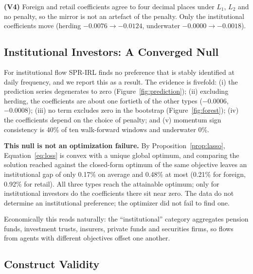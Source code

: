 \textbf{(V4)} Foreign and retail coefficients agree to four decimal places under
$L_1$, $L_2$ and no penalty, so the mirror is not an artefact of the penalty.
Only the institutional coefficients move (herding
$-0.0076\rightarrow-0.0124$, underwater $-0.0000\rightarrow-0.0018$).

\subsection{Institutional Investors: A Converged Null}
\label{sec:null}

For institutional flow SPR-IRL finds no preference that is stably identified at
daily frequency, and we report this as a result. The evidence is fivefold:
(i) the prediction series degenerates to zero (Figure~\ref{fig:prediction});
(ii) excluding herding, the coefficients are about one fortieth of the other
types ($-0.0006$, $-0.0008$); (iii) no term excludes zero in the bootstrap
(Figure~\ref{fig:forest}); (iv) the coefficients depend on the choice of penalty;
and (v) momentum sign consistency is 40\% of ten walk-forward windows and
underwater 0\%.

\textbf{This null is not an optimization failure.} By
Proposition~\ref{prop:lasso}, Equation~\eqref{eq:loss} is convex with a unique
global optimum, and comparing the solution reached against the closed-form
optimum of the same objective leaves an institutional gap of only 0.17\% on
average and 0.48\% at most (0.21\% for foreign, 0.92\% for retail). All three
types reach the attainable optimum; only for institutional investors do the
coefficients there sit near zero. The data do not determine an institutional
preference; the optimizer did not fail to find one.

Economically this reads naturally: the ``institutional'' category aggregates
pension funds, investment trusts, insurers, private funds and securities firms,
so flows from agents with different objectives offset one another.

\subsection{Construct Validity}
\label{sec:construct}

